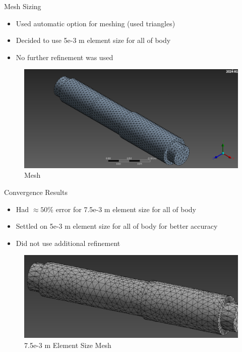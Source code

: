 \documentclass[11pt]{beamer}
\begin{document}
    \begin{frame}{Mesh Sizing}
       \begin{itemize} 
            \item Used automatic option for meshing (used triangles)
            \item Decided to use 5e-3 m element size for all of body
            \item No further refinement was used
        \end{itemize}

        \vspace{10pt}
        \begin{figure}[H]
            \centering
            \vspace{-17pt}
            \includegraphics[scale=0.215]{figs/mesh_iso.png}
            \caption{Mesh}
        \end{figure}
    \end{frame}

    \begin{frame}{Convergence Results} 
        \begin{itemize}
            \item Had $\approx50\%$ error for 7.5e-3 m element size for all of body
            \item Settled on 5e-3 m element size for all of body for better accuracy
            \item Did not use additional refinement
        \end{itemize}
        \vspace{10pt}
        \begin{figure}[H]
            \centering
            \vspace{-17pt}
            \includegraphics[scale=0.215]{figs/old_mesh_coarse_cropped.png}
            \caption{7.5e-3 m Element Size Mesh}
        \end{figure}
    \end{frame}
\end{document}
